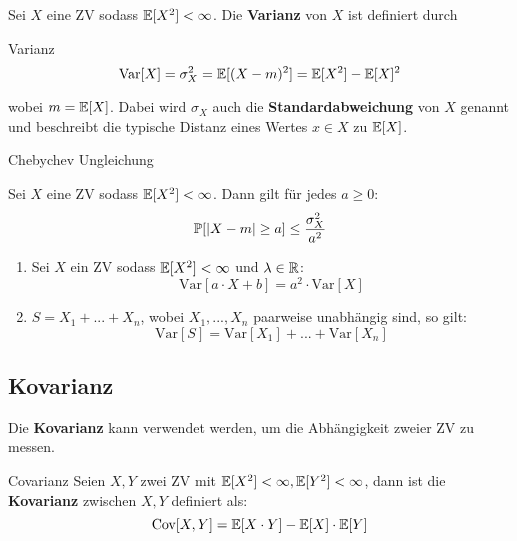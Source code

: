 Sei $X$ eine ZV sodass $\mathbb{E}[X^2] < \infty$. Die \textbf{Varianz} von $X$ ist definiert durch 
\begin{mainbox}{Varianz}
   $$\text{Var}[X] = \sigma_X^2 = \mathbb{E}[(X-m)^2] = \mathbb{E}[X^2] - \mathbb{E}[X]^2$$ 
\end{mainbox}

wobei $m = \mathbb{E}[X]$. Dabei wird $\sigma_X$ auch die \textbf{Standardabweichung} von $X$ genannt und beschreibt die typische Distanz eines Wertes $x \in X$ zu $\mathbb{E}[X]$. \medskip

\begin{mainbox}
    {Chebychev Ungleichung}
    
    Sei $X$ eine ZV sodass $\mathbb{E}[X^2] < \infty$. Dann gilt für jedes $a \geq 0$:
    $$\mathbb{P}[|X - m| \geq a] \leq \frac{\sigma_X^2}{a^2}$$
\end{mainbox}

\begin{subbox}{}
    \begin{enumerate}
        \item Sei $X$ ein ZV sodass $\mathbb{E}[X^2] < \infty$ und $\lambda \in \mathbb{R}$: 
        $$\text{Var}[a \cdot X + b] = a^2 \cdot \text{Var}[X]$$
        \item $S = X_1 + ... + X_n$, wobei $X_1,...,X_n$ paarweise unabhängig sind, so gilt:
        $$\text{Var}[S] = \text{Var}[X_1] + ... + \text{Var}[X_n]$$
    \end{enumerate}
\end{subbox}


\subsection{Kovarianz}

Die \textbf{Kovarianz} kann verwendet werden, um die Abhängigkeit zweier ZV zu messen.

\begin{mainbox}{Covarianz}
    Seien $X, Y$ zwei ZV mit $\mathbb{E}[X^2] < \infty, \mathbb{E}[Y^2] < \infty$, dann ist die \textbf{Kovarianz} zwischen $X, Y$ definiert als:
    $$\text{Cov}[X,Y] = \mathbb{E}[X \cdot Y] - \mathbb{E}[X] \cdot \mathbb{E}[Y]$$
\end{mainbox}